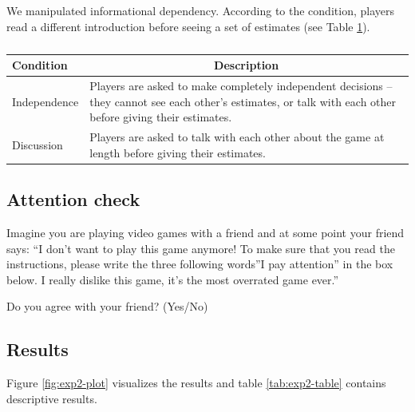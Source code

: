 \documentclass[
  doc,floatsintext]{apa6}
\begin{document}
\FloatBarrier

We manipulated informational dependency. According to the condition, players read a different introduction before seeing a set of estimates (see Table \ref{tab:exp2-conditions}).

\begin{table}[tbp]

\begin{center}
\begin{threeparttable}

\caption{\label{tab:exp2-conditions}}

\begin{tabular}{m{3cm}m{12cm}}
\toprule
Condition & \multicolumn{1}{c}{Description}\\
\midrule
Independence & Players are asked to make completely independent decisions – they cannot see each other’s estimates, or talk with each other before giving their estimates.\\
Discussion & Players are asked to talk with each other about the game at length before giving their estimates.\\
\bottomrule
\end{tabular}

\end{threeparttable}
\end{center}

\end{table}

\subsection{Attention check}\label{attention-check-1}

Imagine you are playing video games with a friend and at some point your friend says: ``I don't want to play this game anymore! To make sure that you read the instructions, please write the three following words''I pay attention'' in the box below. I really dislike this game, it's the most overrated game ever.''

Do you agree with your friend? (Yes/No)

\subsection{Results}\label{results-1}

Figure \ref{fig:exp2-plot} visualizes the results and table \ref{tab:exp2-table} contains descriptive results.
\end{document}
